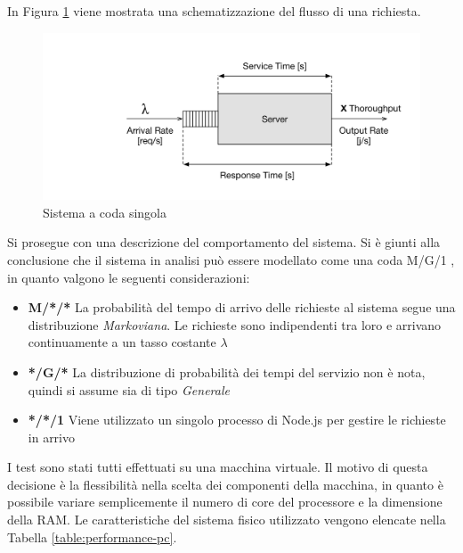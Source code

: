 In Figura \ref{fig:sistema-coda} viene mostrata una schematizzazione del flusso di una richiesta.

\begin{figure}[ht]
	\centering
	\includegraphics[width=\textwidth]{7-performance/Immagini/sistema_coda.png}
	\caption{Sistema a coda singola}\label{fig:sistema-coda}
\end{figure}

Si prosegue con una descrizione del comportamento del sistema. Si è giunti alla conclusione che il sistema in analisi può essere modellato come una coda M/G/1 \cite{sundarapandian2009probability}, in quanto valgono le seguenti considerazioni:

\begin{itemize}
	\item \textbf{M/*/*}
	La probabilità del tempo di arrivo delle richieste al sistema segue una distribuzione \emph{Markoviana}. Le richieste sono indipendenti tra loro e arrivano continuamente a un tasso costante $ \lambda $
	\item \textbf{*/G/*}
	La distribuzione di probabilità dei tempi del servizio non è nota, quindi si assume sia di tipo \emph{Generale}
	\item \textbf{*/*/1}
	Viene utilizzato un singolo processo di Node.js per gestire le richieste in arrivo
\end{itemize}

I test sono stati tutti effettuati su una macchina virtuale. Il motivo di questa decisione è la flessibilità nella scelta dei componenti della macchina, in quanto è possibile variare semplicemente il numero di core del processore e la dimensione della RAM. Le caratteristiche del sistema fisico utilizzato vengono elencate nella Tabella \ref{table:performance-pc}.

